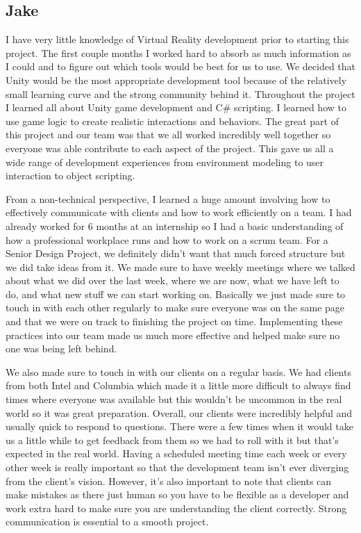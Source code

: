 \documentclass[10pt,journal,compsoc,onecolumn, draftclsnofoot]{IEEEtran}
\begin{document}
\begin{itemize}
\subsection{Jake}
I have very little knowledge of Virtual Reality development prior to starting this project. The first couple months I worked hard to absorb as much information as I could and to figure out which tools would be best for us to use. We decided that Unity would be the most appropriate development tool because of the relatively small learning curve and the strong community behind it. Throughout the project I learned all about Unity game development and C# scripting. I learned how to use game logic to create realistic interactions and behaviors. The great part of this project and our team was that we all worked incredibly well together so everyone was able contribute to each aspect of the project. This gave us all a wide range of development experiences from environment modeling to user interaction to object scripting.

From a non-technical perspective, I learned a huge amount involving how to effectively communicate with clients and how to work efficiently on a team. I had already worked for 6 months at an internship so I had a basic understanding of how a professional workplace runs and how to work on a scrum team. For a Senior Design Project, we definitely didn’t want that much forced structure but we did take ideas from it. We made sure to have weekly meetings where we talked about what we did over the last week, where we are now, what we have left to do, and what new stuff we can start working on. Basically we just made sure to touch in with each other regularly to make sure everyone was on the same page and that we were on track to finishing the project on time. Implementing these practices into our team made us much more effective and helped make sure no one was being left behind.

We also made sure to touch in with our clients on a regular basis. We had clients from both Intel and Columbia which made it a little more difficult to always find times where everyone was available but this wouldn’t be uncommon in the real world so it was great preparation. Overall, our clients were incredibly helpful and usually quick to respond to questions. There were a few times when it would take us a little while to get feedback from them so we had to roll with it but that’s expected in the real world. Having a scheduled meeting time each week or every other week is really important so that the development team isn’t ever diverging from the client’s vision. However, it’s also important to note that clients can make mistakes as there just human so you have to be flexible as a developer and work extra hard to make sure you are understanding the client correctly. Strong communication is essential to a smooth project.


\end{itemize}
\end{document}

